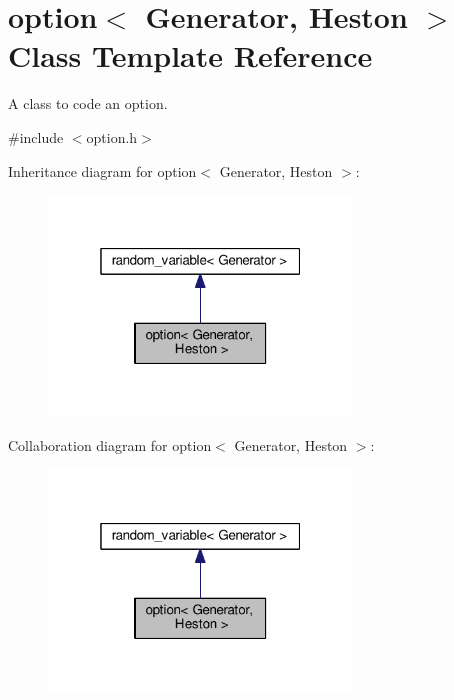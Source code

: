 \hypertarget{classoption}{}\section{option$<$ Generator, Heston $>$ Class Template Reference}
\label{classoption}


A class to code an option.  




{\ttfamily \#include $<$option.\+h$>$}



Inheritance diagram for option$<$ Generator, Heston $>$\+:\nopagebreak
\begin{figure}[H]
\begin{center}
\leavevmode
\includegraphics[width=229pt]{classoption__inherit__graph}
\end{center}
\end{figure}


Collaboration diagram for option$<$ Generator, Heston $>$\+:\nopagebreak
\begin{figure}[H]
\begin{center}
\leavevmode
\includegraphics[width=229pt]{classoption__coll__graph}
\end{center}
\end{figure}
